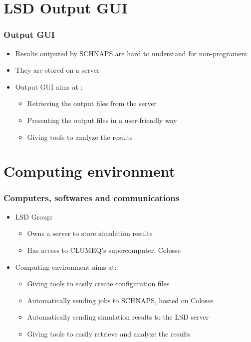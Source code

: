 \documentclass[notes, handout]{beamer}
\begin{document}
\section*{LSD Output GUI}
\begin{frame}
	\frametitle{Output GUI}
	\begin{itemize}
		\item Results outputed by SCHNAPS are hard to understand for non-programers
		\item They are stored on a server
		\item Output GUI aims at : 
		\begin{itemize}
			\item{Retrieving the output files from the server}
			\item{Presenting the output files in a user-friendly way}
			\item{Giving tools to analyze the results}
		\end{itemize} 
	\end{itemize}
\end{frame}

\section*{Computing environment}
\begin{frame}
	\frametitle{Computers, softwares and communications}
	\begin{itemize}
	\item LSD Group:
		\begin{itemize}
			\item Owns a server to store simulation results
			\item Has access to CLUMEQ's supercomputer, Colosse
		\end{itemize}
	\item Computing environment aims at:
		\begin{itemize}
			\item Giving tools to easily create configuration files
			\item Automatically sending jobs to SCHNAPS, hosted on Colosse
			\item Automatically sending simulation results to the LSD server
			\item Giving tools to easily retrieve and analyze the results
		\end{itemize}
	\end{itemize}
\end{frame}
\end{document}
